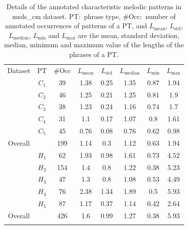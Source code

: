 {{{{\renewcommand{\arraystretch}{1.5}
	\begin{table} 
		\begin{centering}
			\begin{tabular}{ c c|c c c c c c}
				\tabletop
				Dataset	& PT 	&	\#Occ & $L_{\mathrm{mean}}$ & $L_{\mathrm{std}}$ &	$L_{\mathrm{median}}$ & $L_{\mathrm{min}}$ 	&	$L_{\mathrm{max}}$\\
				\tablemid
				\multirow{5}{*}{\acrshort{msds_cm_cmd}} 
				& $C_1$ & 39 & 1.38 & 0.25 & 1.35 & 0.87 & 1.94\\
				& $C_2$ & 46 & 1.25 & 0.21 & 1.25 & 0.81 & 1.9\\
				& $C_3$ & 38 & 1.23 & 0.24 & 1.16 & 0.74 & 1.7\\
				& $C_4$ & 31 & 1.1  & 0.17 & 1.07 & 0.8  & 1.61\\
				& $C_5$ & 45 & 0.76 & 0.08 & 0.76 & 0.62 & 0.98\\
				\tablemid
				Overall	&  	& 199& 1.14 & 0.3  & 1.12 & 0.63 & 1.94\\
				
				\tabletop		 
				\multirow{5}{*}{\acrshort{msds_cm_hmd}} 
				&  $H_1$& 62	&	1.93 & 0.98	&	1.61 &	0.73	&	4.52\\
				& $H_2$ & 154 	& 	1.4  & 0.8 	& 	1.22 & 	0.38 	& 5.23 \\
				& $H_3$ & 47  	& 	1.3  & 0.8 	& 	1.08 & 	0.53 	& 4.49\\
				& $H_4$ & 76  	& 	2.38 & 1.34	& 	1.89 &	0.5  	& 5.93\\
				& $H_5$ & 87  	& 	1.17 & 0.37	& 	1.14 & 	0.42 	& 2.64\\
				
				\tablemid
				Overall	&  	& 426 & 1.6 & 0.99& 1.27 & 0.38 & 5.93\\
				
				\tablebot
			\end{tabular}
			\caption[Details of the annotated characteristic melodic patterns in \acrshort{msds_cm} dataset.]{Details of the annotated characteristic melodic patterns in \acrshort{msds_cm} dataset. PT:~phrase type, \#Occ:~number of annotated occurrences of  patterns of a PT, and $L_{\mathrm{mean}}$, $L_{\mathrm{std}}$, $L_{\mathrm{median}}$, $L_{\mathrm{min}}$ and $L_{\mathrm{max}}$ are the mean, standard deviation, median, minimum and maximum value of the lengths of the phrases of a PT.} 
			\label{tab:categorywise_details_revised_melodic_similarity_dataset}
			\par \end{centering}
	\end{table}
		
}}}}
